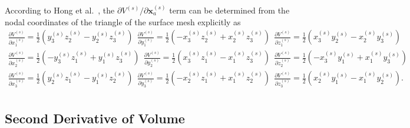 \documentclass[12pt,aps,pre]{revtex4}
\begin{document}
According to Hong et al.\ \cite{Hong:2006vz}, the $\partial V^{(s)}/\partial \pmb{x}_a^{(s)}$ term can be determined from the nodal coordinates of the triangle of the surface mesh explicitly as
%
\begin{eqnarray}
\frac{\partial V^{(s)}}{\partial x^{(s)}_1} = \frac{1}{2} \left(y^{(s)}_3 z^{(s)}_2 - y^{(s)}_2 z^{(s)}_3 \right) \ \
\frac{\partial V^{(s)}}{\partial y^{(s)}_1} = \frac{1}{2} \left(-x^{(s)}_3 z^{(s)}_2 + x^{(s)}_2 z^{(s)}_3 \right) \ \
\frac{\partial V^{(s)}}{\partial z^{(s)}_1} = \frac{1}{2} \left(x^{(s)}_3 y^{(s)}_2 - x^{(s)}_2 y^{(s)}_3 \right) \nonumber\\
\frac{\partial V^{(s)}}{\partial x^{(s)}_2} = \frac{1}{2} \left(-y^{(s)}_3 z^{(s)}_1 + y^{(s)}_1 z^{(s)}_3 \right) \ \
\frac{\partial V^{(s)}}{\partial y^{(s)}_2} = \frac{1}{2} \left(x^{(s)}_3 z^{(s)}_1 - x^{(s)}_1 z^{(s)}_3 \right) \ \
\frac{\partial V^{(s)}}{\partial z^{(s)}_2} = \frac{1}{2} \left(-x^{(s)}_3 y^{(s)}_1 + x^{(s)}_1 y^{(s)}_3 \right) \nonumber\\
\frac{\partial V^{(s)}}{\partial x^{(s)}_3} = \frac{1}{2} \left(y^{(s)}_2 z^{(s)}_1 - y^{(s)}_1 z^{(s)}_2 \right) \ \
\frac{\partial V^{(s)}}{\partial y^{(s)}_3} = \frac{1}{2} \left(-x^{(s)}_2 z^{(s)}_1 + x^{(s)}_1 z^{(s)}_2 \right) \ \
\frac{\partial V^{(s)}}{\partial z^{(s)}_3} = \frac{1}{2} \left(x^{(s)}_2 y^{(s)}_1 - x^{(s)}_1 y^{(s)}_2 \right). \nonumber\\
\label{eq:dVdu_explicit}
\end{eqnarray}
%

\subsection{Second Derivative of Volume}
\end{document}
